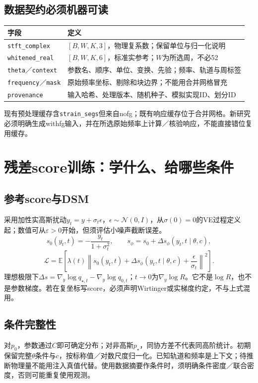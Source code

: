 \documentclass[UTF8,fontset=none,a4paper,11pt]{ctexart}
\newcommand{\code}[1]{\texttt{\nolinkurl{#1}}}
\begin{document}
\subsection{数据契约必须机器可读}
\par\noindent\begin{tabularx}{\linewidth}{p{35mm}Y}\toprule
字段 & 定义\\\midrule
\code{stft_complex} & $[B,W,K,3]$，物理复系数；保留单位与归一化说明\\
\code{whitened_real} & $[B,W,K,6]$，标准实参考；$W$为所选周，不必52\\
\code{theta}／\code{context} & 参数名、顺序、单位、变换、先验；频率、轨道与周标签\\
\code{frequency}／\code{mask} & 原始频率坐标、剔除和块边界；不能用合并网格冒充\\
\code{provenance} & 输入哈希、处理版本、随机种子、模拟实现ID、划分ID\\\bottomrule
\end{tabularx}\par
现有预处理缓存含\code{strain_segs}但来自nofg；既有响应缓存位于合并网格。新研究必须明确生成withfg输入，并在所选原始频率上计算／核验响应，不能直接错位复用缓存。
\clearpage

\section{残差score训练：学什么、给哪些条件}
\subsection{参考score与DSM}
采用加性实高斯扰动$y_t=y+\sigma_t\epsilon$，$\epsilon\sim\mathcal N(0,I)$，从$\sigma(0)=0$的VE过程定义起；数值可从$\varepsilon>0$开始，但须评估小噪声截断误差。
\[
s_0(y_t,t)=-\frac{y_t}{1+\sigma_t^2},\qquad
s_\phi=s_0+\Delta s_\phi(y_t,t\mid\theta,c),
\]
\[
\mathcal L=\mathbb E\left[\lambda(t)
\left\|s_0(y_t,t)+\Delta s_\phi(y_t,t\mid\theta,c)
+\frac{\epsilon}{\sigma_t}\right\|^2\right].
\]
理想极限下$\Delta s=\nabla_y\log q_{\star,t}-\nabla_y\log q_{0,t}$；$t\to0$为$\nabla_y\log R$。它不是$\log R$，也不是参数梯度。若在复坐标写score，必须声明Wirtinger或实梯度约定，不与上式混用。
\subsection{条件完整性}
对$p_0$，参数通过$C$即可确定分布；对非高斯$p_\star$，同协方差不代表同高阶统计。初期保留完整$\theta$条件与$c$，按标称值／对数尺度归一化。已知轨道和频率是上下文；待推断物理量不能用注入真值代替。使用数据摘要作条件时，须明确条件密度／联合密度，否则可能重复使用观测。
\end{document}
